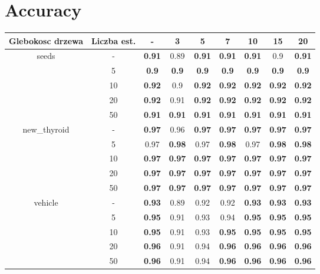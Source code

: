 \documentclass{article}%
\begin{document}
%
\normalsize%
\section*{Accuracy}%
\begin{longtable}{c|c|ccccccc}%
\hline%
Glebokosc drzewa&Liczba est.&{-}&3&5&7&10&15&20\\%
\hline%
\multirow{5}{*}{seeds}&{-}&\textbf{0.91}&0.89&\textbf{0.91}&\textbf{0.91}&\textbf{0.91}&0.9&\textbf{0.91}\\%
\cline{2%
-%
9}%
&5&\textbf{0.9}&\textbf{0.9}&\textbf{0.9}&\textbf{0.9}&\textbf{0.9}&\textbf{0.9}&\textbf{0.9}\\%
\cline{2%
-%
9}%
&10&\textbf{0.92}&0.9&\textbf{0.92}&\textbf{0.92}&\textbf{0.92}&\textbf{0.92}&\textbf{0.92}\\%
\cline{2%
-%
9}%
&20&\textbf{0.92}&0.91&\textbf{0.92}&\textbf{0.92}&\textbf{0.92}&\textbf{0.92}&\textbf{0.92}\\%
\cline{2%
-%
9}%
&50&\textbf{0.91}&\textbf{0.91}&\textbf{0.91}&\textbf{0.91}&\textbf{0.91}&\textbf{0.91}&\textbf{0.91}\\%
\hline%
\multirow{5}{*}{new\_thyroid}&{-}&\textbf{0.97}&0.96&\textbf{0.97}&\textbf{0.97}&\textbf{0.97}&\textbf{0.97}&\textbf{0.97}\\%
\cline{2%
-%
9}%
&5&0.97&\textbf{0.98}&0.97&\textbf{0.98}&0.97&\textbf{0.98}&\textbf{0.98}\\%
\cline{2%
-%
9}%
&10&\textbf{0.97}&\textbf{0.97}&\textbf{0.97}&\textbf{0.97}&\textbf{0.97}&\textbf{0.97}&\textbf{0.97}\\%
\cline{2%
-%
9}%
&20&\textbf{0.97}&\textbf{0.97}&\textbf{0.97}&\textbf{0.97}&\textbf{0.97}&\textbf{0.97}&\textbf{0.97}\\%
\cline{2%
-%
9}%
&50&\textbf{0.97}&\textbf{0.97}&\textbf{0.97}&\textbf{0.97}&\textbf{0.97}&\textbf{0.97}&\textbf{0.97}\\%
\hline%
\multirow{5}{*}{vehicle}&{-}&\textbf{0.93}&0.89&0.92&0.92&\textbf{0.93}&\textbf{0.93}&\textbf{0.93}\\%
\cline{2%
-%
9}%
&5&\textbf{0.95}&0.91&0.93&0.94&\textbf{0.95}&\textbf{0.95}&\textbf{0.95}\\%
\cline{2%
-%
9}%
&10&\textbf{0.95}&0.91&0.93&\textbf{0.95}&\textbf{0.95}&\textbf{0.95}&\textbf{0.95}\\%
\cline{2%
-%
9}%
&20&\textbf{0.96}&0.91&0.94&\textbf{0.96}&\textbf{0.96}&\textbf{0.96}&\textbf{0.96}\\%
\cline{2%
-%
9}%
&50&\textbf{0.96}&0.91&0.94&\textbf{0.96}&\textbf{0.96}&\textbf{0.96}&\textbf{0.96}\\%

\end{longtable}
\end{document}
